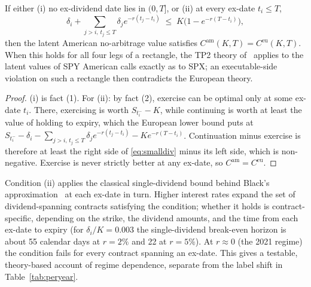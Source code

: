 \documentclass[sigconf,review,anonymous]{acmart}
\begin{document}
\begin{proposition}[Europeanization]\label{prop:euro}
If either (i) no ex-dividend date lies in $(0,T]$, or (ii) at every ex-date $t_i\le T$,
\begin{equation}
\textstyle\delta_i+\sum_{j>i,\,t_j\le T}\delta_j e^{-r(t_j-t_i)}\;\le\;K\big(1-e^{-r(T-t_i)}\big),
\label{eq:smalldiv}
\end{equation}
then the latent American no-arbitrage value satisfies $C^{\mathrm{am}}(K,T)=C^{\mathrm{eu}}(K,T)$. When this holds for all four legs of a rectangle, the TP2 theory of~\cite{glasserman2026tp2theory} applies to the latent values of SPY American calls exactly as to SPX; an executable-side violation on such a rectangle then contradicts the European theory.
\end{proposition}
\begin{proof}
(i) is fact (1). For (ii): by fact (2), exercise can be optimal only at some ex-date $t_i$. There, exercising is worth $S_{t_i^-}-K$, while continuing is worth at least the value of holding to expiry, which the European lower bound puts at $S_{t_i^-}-\delta_i-\sum_{j>i,\,t_j\le T}\delta_je^{-r(t_j-t_i)}-Ke^{-r(T-t_i)}$. Continuation minus exercise is therefore at least the right side of \eqref{eq:smalldiv} minus its left side, which is non-negative. Exercise is never strictly better at any ex-date, so $C^{\mathrm{am}}=C^{\mathrm{eu}}$.
\end{proof}
\noindent Condition (ii) applies the classical single-dividend bound behind Black's approximation~\cite{merton1973,black1975} at each ex-date in turn. Higher interest rates expand the set of dividend-spanning contracts satisfying the condition; whether it holds is contract-specific, depending on the strike, the dividend amounts, and the time from each ex-date to expiry (for $\delta_i/K=0.003$ the single-dividend break-even horizon is about 55 calendar days at $r=2\%$ and 22 at $r=5\%$). At $r\approx0$ (the 2021 regime) the condition fails for every contract spanning an ex-date. This gives a testable, theory-based account of regime dependence, separate from the label shift in Table~\ref{tab:peryear}.
\end{document}

